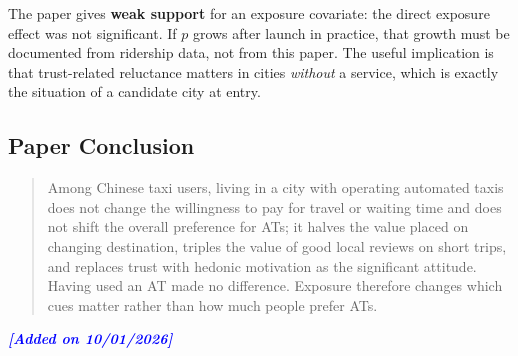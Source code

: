 \documentclass[10pt,a4paper]{article}
\begin{document}
\begin{mdframed}[linecolor=red!60,linewidth=2pt]
The paper gives \textbf{weak support} for an exposure covariate: the direct exposure effect was not significant. If $p$ grows after launch in practice, that growth must be documented from ridership data, not from this paper. The useful implication is that trust-related reluctance matters in cities \emph{without} a service, which is exactly the situation of a candidate city at entry.

\hypertarget{paper-conclusion-6}{%
\subsection{Paper Conclusion}\label{paper-conclusion-6}}

\begin{quote}
Among Chinese taxi users, living in a city with operating automated taxis does not change the willingness to pay for travel or waiting time and does not shift the overall preference for ATs; it halves the value placed on changing destination, triples the value of good local reviews on short trips, and replaces trust with hedonic motivation as the significant attitude. Having used an AT made no difference. Exposure therefore changes which cues matter rather than how much people prefer ATs.
\end{quote}

\end{mdframed}
\textit{\textbf{\textcolor{blue}{[Added on 10/01/2026]}}}
\end{document}
